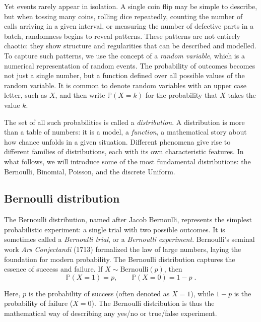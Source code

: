 \documentclass{book}
\begin{document}
\medskip

Yet events rarely appear in isolation. A single coin flip may be simple to describe, but when tossing many coins, rolling dice repeatedly, counting the number of calls arriving in a given interval, or measuring the number of defective parts in a batch, randomness begins to reveal patterns. These patterns are not entirely chaotic: they show structure and regularities that can be described and modelled. To capture such patterns, we use the concept of a \textit{random variable}, which is a numerical representation of random events. The probability of outcomes becomes not just a single number, but a function defined over all possible values of the random variable. It is common to denote random variables with an upper case letter, such as $X$, and then write $\mathbb{P}(X = k)$ for the probability that $X$ takes the value $k$.

\medskip

The set of all such probabilities is called a \textit{distribution}. A distribution is more than a table of numbers: it is a model, a \textit{function}, a mathematical story about how chance unfolds in a given situation. Different phenomena give rise to different families of distributions, each with its own characteristic features. In what follows, we will introduce some of the most fundamental distributions: the Bernoulli, Binomial, Poisson, and the discrete Uniform.

\medskip

\subsection*{Bernoulli distribution}

The Bernoulli distribution, named after Jacob Bernoulli, represents the simplest probabilistic experiment: a single trial with two possible outcomes. It is sometimes called a \textit{Bernoulli trial}, or a \textit{Bernoulli experiment}. Bernoulli's seminal work \emph{Ars Conjectandi} (1713) \cite{bernoulli-ars} formalized the law of large numbers, laying the foundation for modern probability. The Bernoulli distribution captures the essence of success and failure. If $X \sim \text{Bernoulli}(p)$, then
\begin{equation}
	\mathbb{P}(X = 1) = p, \qquad \mathbb{P}(X = 0)= 1 - p \; .
	\label{eq:bernoulli1}
\end{equation}

Here, $p$ is the probability of success (often denoted as $X=1$), while $1-p$ is the probability of failure ($X=0$). The Bernoulli distribution is thus the mathematical way of describing any yes/no or true/false experiment.
\end{document}
